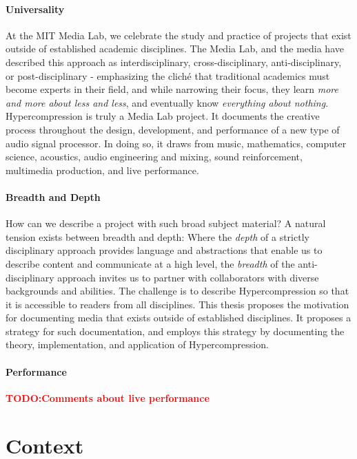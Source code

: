 \documentclass{tufte-book}
\newcommand{\TODO}[1]{\textcolor{red}{\bf TODO:#1}\xspace}
\newcommand{\thesis}{Hypercompression\xspace}
\begin{document}
\paragraph{Universality} At the MIT Media Lab, we celebrate the study
and practice of projects that exist outside of established academic
disciplines. The Media Lab, and the media have described this approach
as interdisciplinary, cross-disciplinary, anti-disciplinary, or
post-disciplinary - emphasizing the clich\'{e} that traditional
academics must become experts in their field, and while narrowing
their focus, they learn \textit{more and more about less and less},
and eventually know \textit{everything about nothing}.  \thesis is
truly a Media Lab project. It documents the creative process
throughout the design, development, and performance of a new type of
audio signal processor. In doing so, it draws from music, mathematics,
computer science, acoustics, audio engineering and mixing, sound
reinforcement, multimedia production, and live performance.

\paragraph{Breadth and Depth} How can we describe a project with such
broad subject material?  A natural tension exists between breadth and
depth: Where the \textit{depth} of a strictly disciplinary approach
provides language and abstractions that enable us to describe content
and communicate at a high level, the \textit{breadth} of the
anti-disciplinary approach invites us to partner with collaborators
with diverse backgrounds and abilities. The challenge is to describe
\thesis so that it is accessible to readers from all disciplines. This
thesis proposes the motivation for documenting media that exists
outside of established disciplines. It proposes a strategy for such
documentation, and employs this strategy by documenting the theory,
implementation, and application of \thesis.

\paragraph{Performance}
\TODO{Comments about live performance}

\section{Context}
\label{sec:context}
\end{document}
